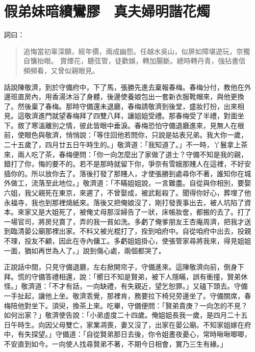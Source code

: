 
\chapter{假弟妹暗續鸞膠　真夫婦明諧花燭}

詞曰：
\begin{quote}
追悔當初辜深願，經年價，兩成幽怨。任越水吳山，似屏如障堪遊玩，奈獨自慵抬眼。
賞煙花，聽弦管，徒歡娛，轉加腸斷。總時轉丹青，強拈書信頻頻看，又曾似親眼見。
\end{quote}

話說陳敬濟，到於守備府中，下了馬，張勝先進去稟報春梅。春梅分付，教他在外邊班直房內，用香湯沐浴了身體，後邊使養娘包出一套新衣服靴帽來，與他更換了。然後稟了春梅。那時守備還未退廳，春梅請敬濟到後堂，盛妝打扮，出來相見。這敬濟進門就望春梅拜了四雙八拜，讓姐姐受禮。那春梅受了半禮，對面坐下。敘了寒溫離別之情，彼此皆眼中垂淚。春梅恐怕守備退廳進來，見無人在根前，使眼色與敬濟，悄悄說：「等住回他若問你，只說是姑表兄弟。我大你一歲，二十五歲了，四月廿五日午時生的。」敬濟道：「我知道了。」不一時，丫鬟拿上茶來，兩人吃了茶，春梅便問：「你一向怎麼出了家做了道士？守備不知是我的親，錯打了你，悔的要不的。若不是那時就留下你，爭奈有雪娥那賤人在這裡，不好安插你的。所以放你去了。落後打發了那賤人，才使張勝到處尋你不著，誰知你在城外做工，流落至此地位。」敬濟道：「不瞞姐姐說，一言難盡。自從與你相別，要娶六姐，我父親死在東京，來遲了，不曾娶成，被武鬆殺了。聞得你好心，葬埋了他永福寺，我也到那裡燒紙來。落後又把俺娘沒了，剛打發喪事出去，被人坑陷了資本。來家又是大姐死了，被俺丈母那淫婦告了一狀，床帳妝奩，都搬的去了。打了一場官司，將房兒賣了，弄的我一貧如洗。多虧了俺爹朋友王杏庵周濟，把我才送到臨清晏公廟那裡出家。不料又被光棍打了，拴到咱府中。自從咱府中出去，投親不理，投友不顧，因此在寺內傭工。多虧姐姐掛心，使張管家尋將我來，得見姐姐一面，猶如再世為人了。」說到傷心處，兩個都哭了。

正說話中間，只見守備退廳，左右掀開帘子，守備進來。這陳敬濟向前，倒身下拜。慌的守備答禮相還，說：「嚮日不知是賢弟，被下人隱瞞，誤有衝撞，賢弟休怪。」敬濟道：「不才有話，一向缺禮，有失親近，望乞恕罪。」又磕下頭去。守備一手扯起，讓他上坐。敬濟乖覺，那裡肯，務要拉下椅兒旁邊坐了。守備關席，春梅陪他對坐下。須臾，換茶上來。吃畢，守備便問：「賢弟貴庚？一向怎的不見？如何出家？」敬濟使告說：「小弟虛度二十四歲。俺姐姐長我一歲，是四月二十五日午時生。向因父母雙亡，家業凋喪，妻又沒了，出家在晏公廟。不知家姐嫁在府中，有失探望。」守備道：「自從賢弟那日去後，你令姐晝夜憂心，常時啾啾唧唧，不安直到如今。一向使人找尋賢弟不著，不期今日相會，實乃三生有緣。」

